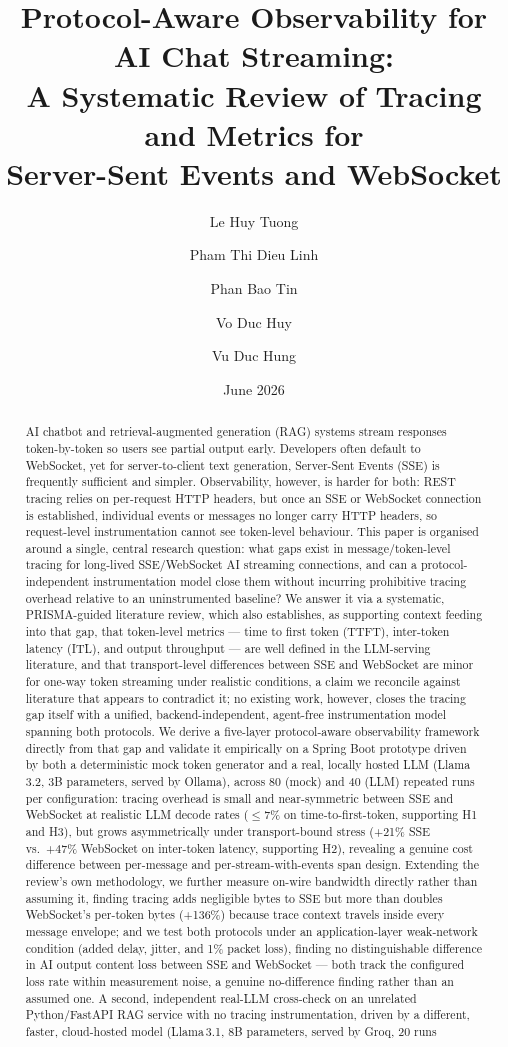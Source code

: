\documentclass[11pt]{article}
\title{Protocol-Aware Observability for AI Chat Streaming:\\
A Systematic Review of Tracing and Metrics for\\
Server-Sent Events and WebSocket}
\author{Le Huy Tuong \and Pham Thi Dieu Linh \and Phan Bao Tin \and Vo Duc Huy \and Vu Duc Hung}
\date{June 2026}
\begin{document}
\maketitle

\begin{abstract}
AI chatbot and retrieval-augmented generation (RAG) systems stream responses token-by-token so users see partial output early. Developers often default to WebSocket, yet for server-to-client text generation, Server-Sent Events (SSE) is frequently sufficient and simpler. Observability, however, is harder for both: REST tracing relies on per-request HTTP headers, but once an SSE or WebSocket connection is established, individual events or messages no longer carry HTTP headers, so request-level instrumentation cannot see token-level behaviour. This paper is organised around a single, central research question: what gaps exist in message/token-level tracing for long-lived SSE/WebSocket AI streaming connections, and can a protocol-independent instrumentation model close them without incurring prohibitive tracing overhead relative to an uninstrumented baseline? We answer it via a systematic, PRISMA-guided literature review, which also establishes, as supporting context feeding into that gap, that token-level metrics --- time to first token (TTFT), inter-token latency (ITL), and output throughput --- are well defined in the LLM-serving literature, and that transport-level differences between SSE and WebSocket are minor for one-way token streaming under realistic conditions, a claim we reconcile against literature that appears to contradict it; no existing work, however, closes the tracing gap itself with a unified, backend-independent, agent-free instrumentation model spanning both protocols. We derive a five-layer protocol-aware observability framework directly from that gap and validate it empirically on a Spring Boot prototype driven by both a deterministic mock token generator and a real, locally hosted LLM (Llama\,3.2, 3B parameters, served by Ollama), across 80 (mock) and 40 (LLM) repeated runs per configuration: tracing overhead is small and near-symmetric between SSE and WebSocket at realistic LLM decode rates ($\le$7\% on time-to-first-token, supporting H1 and H3), but grows asymmetrically under transport-bound stress (+21\% SSE vs.\ +47\% WebSocket on inter-token latency, supporting H2), revealing a genuine cost difference between per-message and per-stream-with-events span design. Extending the review's own methodology, we further measure on-wire bandwidth directly rather than assuming it, finding tracing adds negligible bytes to SSE but more than doubles WebSocket's per-token bytes (+136\%) because trace context travels inside every message envelope; and we test both protocols under an application-layer weak-network condition (added delay, jitter, and 1\% packet loss), finding no distinguishable difference in AI output content loss between SSE and WebSocket --- both track the configured loss rate within measurement noise, a genuine no-difference finding rather than an assumed one. A second, independent real-LLM cross-check on an unrelated Python/FastAPI RAG service with no tracing instrumentation, driven by a different, faster, cloud-hosted model (Llama\,3.1, 8B parameters, served by Groq, 20 runs 
\end{abstract}
\end{document}
